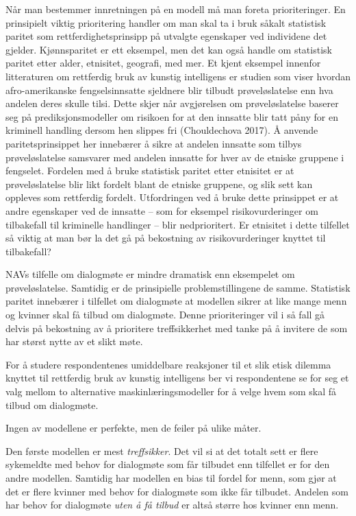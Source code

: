 \documentclass[
]{book}
\begin{document}
Når man bestemmer innretningen på en modell må man foreta prioriteringer.
En prinsipielt viktig prioritering handler om man skal ta i bruk såkalt statistisk paritet som rettferdighetsprinsipp på utvalgte egenskaper ved individene det gjelder.
Kjønnsparitet er ett eksempel, men det kan også handle om statistisk paritet etter alder, etnisitet, geografi, med mer.
Et kjent eksempel innenfor litteraturen om rettferdig bruk av kunstig intelligens er studien som viser hvordan afro-amerikanske fengselsinnsatte sjeldnere blir tilbudt prøveløslatelse enn hva andelen deres skulle tilsi.
Dette skjer når avgjørelsen om prøveløslatelse baserer seg på prediksjonsmodeller om risikoen for at den innsatte blir tatt påny for en kriminell handling dersom hen slippes fri (Chouldechova 2017).
Å anvende paritetsprinsippet her innebærer å sikre at andelen innsatte som tilbys prøveløslatelse samsvarer med andelen innsatte for hver av de etniske gruppene i fengselet.
Fordelen med å bruke statistisk paritet etter etnisitet er at prøveløslatelse blir likt fordelt blant de etniske gruppene, og slik sett kan oppleves som rettferdig fordelt.
Utfordringen ved å bruke dette prinsippet er at andre egenskaper ved de innsatte -- som for eksempel risikovurderinger om tilbakefall til kriminelle handlinger -- blir nedprioritert.
Er etnisitet i dette tilfellet så viktig at man bør la det gå på bekostning av risikovurderinger knyttet til tilbakefall?

NAVs tilfelle om dialogmøte er mindre dramatisk enn eksempelet om prøveløslatelse.
Samtidig er de prinsipielle problemstillingene de samme.
Statistisk paritet innebærer i tilfellet om dialogmøte at modellen sikrer at like mange menn og kvinner skal få tilbud om dialogmøte.
Denne prioriteringer vil i så fall gå delvis på bekostning av å prioritere treffsikkerhet med tanke på å invitere de som har størst nytte av et slikt møte.

For å studere respondentenes umiddelbare reaksjoner til et slik etisk dilemma knyttet til rettferdig bruk av kunstig intelligens ber vi respondentene se for seg et valg mellom to alternative maskinlæringsmodeller for å velge hvem som skal få tilbud om dialogmøte.

Ingen av modellene er perfekte, men de feiler på ulike måter.

Den første modellen er mest \emph{treffsikker}.
Det vil si at det totalt sett er flere sykemeldte med behov for dialogmøte som får tilbudet enn tilfellet er for den andre modellen.
Samtidig har modellen en bias til fordel for menn, som gjør at det er flere kvinner med behov for dialogmøte som ikke får tilbudet.
Andelen som har behov for dialogmøte \emph{uten å få tilbud} er altså større hos kvinner enn menn.
\end{document}
